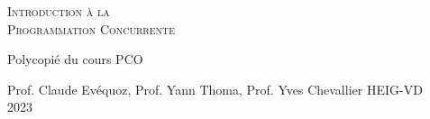 \documentclass[a4paper, 11pt, onecolumn, twoside, openright]{book}
\newcounter{exercicecounter}
\newcommand{\startchapter}{\thispagestyle{myplain}
\setcounter{exercicecounter}{1}}
\begin{document}
\begin{titlepage}
  \logo{1cm}{1cm}
  \centering \vspace*{\fill}%

  {\Huge \scshape Introduction à la\\\vspace{1em}Programmation Concurrente}\par
  \vspace{5em}%
  {\Large Polycopié du cours PCO}\par
  \vspace{5em}%
  \upshape\par
  {\Large Prof. Claude Evéquoz, Prof. Yann Thoma, Prof. Yves Chevallier }%
  \vspace{2em}%
  {\Large
    HEIG-VD\\
    2023}%
  \vspace*{\fill}
\end{titlepage}

\frontmatter
\tableofcontents

\mainmatter







\appendix



\backmatter
\listoffigures
\listoftables
\lstlistoflistings

\let\ifFTR\iftrue\captionsfrench

\nocite{*}


\startchapter
{}

\end{document}
